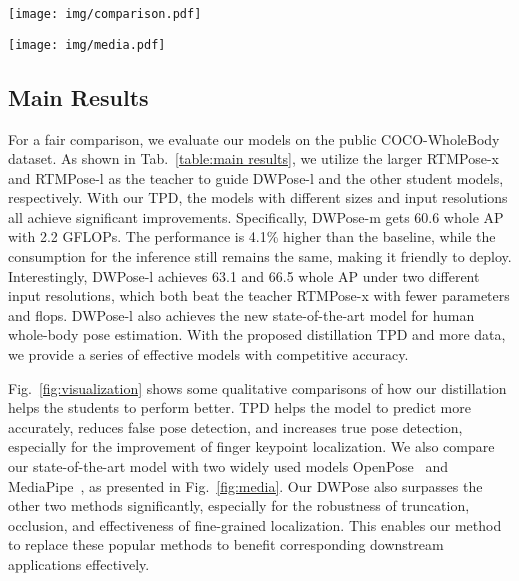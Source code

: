 \documentclass[10pt,twocolumn,letterpaper]{article}
\begin{document}
\begin{figure*}[t]
    \centering
    \texttt{[image: img/comparison.pdf]}
    \caption{Qualitative comparisons of RTMPose-l (left) and DWPose-l (right). Best viewed in color with zoom-in for small parts.}
    \label{fig:visualization}
    \vspace{-0.2cm}
\end{figure*}

\begin{figure*}[t]
    \centering
    \texttt{[image: img/media.pdf]}
    \caption{Qualitative comparisons with two popular whole-body pose estimators. (a) OpenPose; (b) MediaPipe; (c) Our DWPose-l.}
    \label{fig:media}
    \vspace{-0.2cm}
\end{figure*}

\subsection{Main Results}
\label{sec:main results}

For a fair comparison, we evaluate our models on the public COCO-WholeBody dataset. As shown in Tab.~\ref{table:main results}, we utilize the larger RTMPose-x and RTMPose-l as the teacher to guide DWPose-l and the other student models, respectively. With our TPD, the models with different sizes and input resolutions all achieve significant improvements. Specifically, DWPose-m gets 60.6 whole AP with 2.2 GFLOPs. The performance is 4.1\% higher than the baseline, while the consumption for the inference still remains the same, making it friendly to deploy. Interestingly, DWPose-l achieves 63.1 and 66.5 whole AP under two different input resolutions, which both beat the teacher RTMPose-x with fewer parameters and flops. DWPose-l also achieves the new state-of-the-art model for human whole-body pose estimation. With the proposed distillation TPD and more data, we provide a series of effective models with competitive accuracy.

Fig.~\ref{fig:visualization} shows some qualitative comparisons of how our distillation helps the students to perform better. TPD helps the model to predict more accurately, reduces false pose detection, and increases true pose detection, especially for the improvement of finger keypoint localization. We also compare our state-of-the-art model with two widely used models OpenPose~\cite{cao2021openpose} and MediaPipe~\cite{lugaresi2019mediapipe,zhang2020mediapipe}, as presented in Fig.~\ref{fig:media}. Our DWPose also surpasses the other two methods significantly, especially for the robustness of truncation, occlusion, and effectiveness of fine-grained localization. This enables our method to replace these popular methods to benefit corresponding downstream applications effectively.
\end{document}
